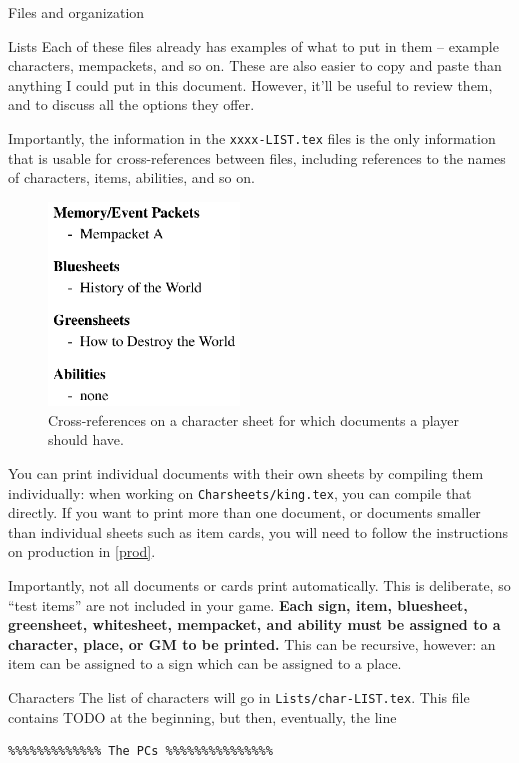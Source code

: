 \documentclass[sheet]{GameTexBase}
\begin{document}
\begin{section}{Files and organization}
\begin{subsection}{Lists}
Each of these files already has examples of what to put in them -- example characters, mempackets, and so on.  These are also easier to copy and paste than anything I could put in this document.
However, it'll be useful to review them, and to discuss all the options they offer.

Importantly, the information in the \lstinline{xxxx-LIST.tex} files is the only information that is usable for cross-references between files, including references to the names of characters, items, abilities, and so on.

\begin{figure}
\centering
\includegraphics[width=2in]{charsheet-crossref}
\caption{Cross-references on a character sheet for which documents a player should have.}
\end{figure}

You can print individual documents with their own sheets by compiling them individually: when working on \lstinline|Charsheets/king.tex|, you can compile that directly.  If you want to print more than one document, or documents smaller than individual sheets such as item cards, you will need to follow the instructions on production in \ref{prod}.

Importantly, not all documents or cards print automatically.  This is deliberate, so ``test items'' are not included in your game.  \textbf{Each sign, item, bluesheet, greensheet, whitesheet, mempacket, and ability must be assigned to a character, place, or GM to be printed.}
This can be recursive, however: an item can be assigned to a sign which can be assigned to a place.  
\end{subsection}
\begin{subsection}{Characters}
\label{charlist}
The list of characters will go in \lstinline|Lists/char-LIST.tex|.  This file contains TODO at the beginning, but then, eventually, the line
\begin{verbatim}
%%%%%%%%%%%%% The PCs %%%%%%%%%%%%%%%
\end{verbatim}


\end{subsection}
\end{section}
\end{document}
